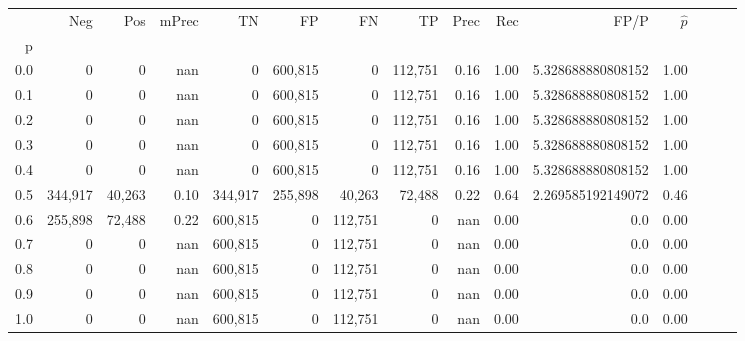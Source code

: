 \begin{tabular}{rrrrrrrrrrrrrrr}
\toprule
{} &      Neg &     Pos & mPrec &       TN &       FP &       FN &       TP &  Prec &   Rec &               FP/P & $\hat{p}$ \\
p   &          &         &       &          &          &          &          &       &       &                    &           \\
\midrule
0.0 &        0 &       0 &   nan &        0 &  600,815 &        0 &  112,751 &  0.16 &  1.00 &  5.328688880808152 &      1.00 \\
0.1 &        0 &       0 &   nan &        0 &  600,815 &        0 &  112,751 &  0.16 &  1.00 &  5.328688880808152 &      1.00 \\
0.2 &        0 &       0 &   nan &        0 &  600,815 &        0 &  112,751 &  0.16 &  1.00 &  5.328688880808152 &      1.00 \\
0.3 &        0 &       0 &   nan &        0 &  600,815 &        0 &  112,751 &  0.16 &  1.00 &  5.328688880808152 &      1.00 \\
0.4 &        0 &       0 &   nan &        0 &  600,815 &        0 &  112,751 &  0.16 &  1.00 &  5.328688880808152 &      1.00 \\
0.5 &  344,917 &  40,263 &  0.10 &  344,917 &  255,898 &   40,263 &   72,488 &  0.22 &  0.64 &  2.269585192149072 &      0.46 \\
0.6 &  255,898 &  72,488 &  0.22 &  600,815 &        0 &  112,751 &        0 &   nan &  0.00 &                0.0 &      0.00 \\
0.7 &        0 &       0 &   nan &  600,815 &        0 &  112,751 &        0 &   nan &  0.00 &                0.0 &      0.00 \\
0.8 &        0 &       0 &   nan &  600,815 &        0 &  112,751 &        0 &   nan &  0.00 &                0.0 &      0.00 \\
0.9 &        0 &       0 &   nan &  600,815 &        0 &  112,751 &        0 &   nan &  0.00 &                0.0 &      0.00 \\
1.0 &        0 &       0 &   nan &  600,815 &        0 &  112,751 &        0 &   nan &  0.00 &                0.0 &      0.00 \\
\bottomrule
\end{tabular}
